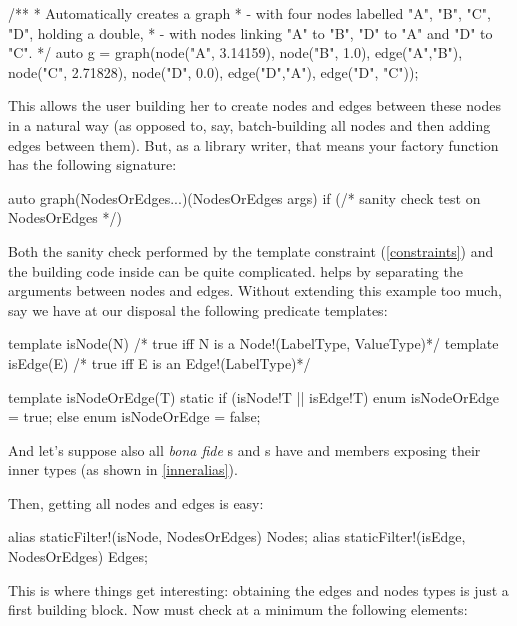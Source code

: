 \begin{dcode}
/** 
* Automatically creates a graph 
*   - with four nodes labelled "A", "B", "C", "D", holding a double, 
*   - with nodes linking "A" to "B", "D" to "A" and "D" to "C".
*/
auto g = graph(node("A", 3.14159), node("B", 1.0), 
               edge("A","B"),
               node("C", 2.71828), node("D", 0.0), 
               edge("D","A"), edge("D", "C"));
\end{dcode}

This allows the user building her  to create nodes and edges between these nodes in a natural way (as opposed to, say, batch-building all nodes and then adding edges between them). But, as a library writer, that means your  factory function has the following signature:

\begin{dcode}
auto graph(NodesOrEdges...)(NodesOrEdges args) 
if (/* sanity check test on NodesOrEdges */)
\end{dcode}

Both the sanity check performed by the template constraint (\ref{constraints}) and the building code inside  can be quite complicated.  helps by separating the arguments between nodes and edges. Without extending this example too much, say we have at our disposal the following predicate templates:

\begin{dcode}
template isNode(N) {/* true iff N is a Node!(LabelType, ValueType)*/}
template isEdge(E) {/* true iff E is an Edge!(LabelType)*/}

template isNodeOrEdge(T)
{
    static if (isNode!T || isEdge!T)
        enum isNodeOrEdge = true;
    else
        enum isNodeOrEdge = false;
}
\end{dcode}

And let's suppose also all \emph{bona fide} s and s have   and  members exposing their inner types (as shown in \autoref{inneralias}).

Then, getting all nodes and edges is easy:
\begin{dcode}
alias staticFilter!(isNode, NodesOrEdges) Nodes;
alias staticFilter!(isEdge, NodesOrEdges) Edges;
\end{dcode}

This is where things get interesting: obtaining the edges and nodes types is just a first building block. Now  must check at a minimum the following elements:

